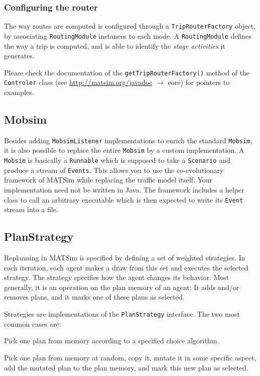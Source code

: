 \subsubsection{Configuring the router}

The way routes are computed is configured
through a \lstinline{TripRouterFactory} object,
by associating \lstinline{RoutingModule} instances to each mode.
A \lstinline{RoutingModule} defines the way a trip is computed,
and is able to identify the \emph{stage activities} it generates.

Please check the documentation of the \lstinline{getTripRouterFactory()} method of the \lstinline{Controler} class (see \url{http://matsim.org/javadoc} $\to$ core) for pointers to examples.


\subsection{Mobsim}
\label{sec:mobsim-extension-point}

Besides adding \lstinline|MobsimListener| implementations to enrich the standard \lstinline|Mobsim|, it is also possible to replace
the entire \lstinline|Mobsim| by a custom implementation. A \lstinline|Mobsim| is basically
a \lstinline|Runnable| which is supposed to take a \lstinline|Scenario| and
produce a stream of \lstinline|Events|.
This allows you to use the co-evolutionary framework of MATSim while replacing the traffic model itself.
Your implementation need not be written in Java. The framework includes a helper class to call an arbitrary
executable which is then expected to write its \lstinline|Event| stream into a file. 

\subsection{PlanStrategy}
\label{sec:replanning-extension-point}
Replanning in MATSim is specified by defining a set of weighted strategies. In each
iteration, each agent makes a draw from this set and executes the selected strategy. The
strategy specifies how the agent changes its behavior. Most generally, it is an operation on the plan memory
of an agent: It adds and/or removes plans, and it marks one of these plans as selected.

Strategies are implementations of the \lstinline|PlanStrategy| interface. 
The two most common cases are:
\begin{compactitem}
\item Pick one plan from memory according to a specified choice algorithm.
\item Pick one plan from memory
at random, copy it, mutate it in some specific aspect, add the mutated plan to the plan memory, and
mark this new plan as selected.
\end{compactitem}

